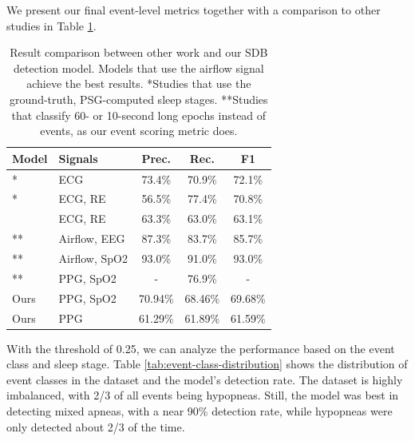 We present our final event-level metrics together with a comparison to other studies in Table \ref{tab:final-metrics}.

\renewcommand{\arraystretch}{1.5}
\begin{table}
    \centering
    \begin{tabular}{ l l c c c }
        Model & Signals & Prec. & Rec. & F1\\
        \hline
        \cite{olsen2020robust}* & ECG & 73.4\% & 70.9\% & 72.1\% \\
        \cite{xie2023use}* & ECG, RE & 56.5\% & 77.4\% & 70.8\% \\
        \cite{xie2024multi} & ECG, RE & 63.3\% & 63.0\% & 63.1\% \\
        \cite{li2023deep}** & Airflow, EEG & 87.3\% & 83.7\% & 85.7\% \\
        \cite{yook2024deep}** & Airflow, SpO2 & 93.0\% & 91.0\% & 93.0\% \\
        \cite{lazazzera2020detection}** & PPG, SpO2 & - & 76.9\% & - \\
        Ours & PPG, SpO2 & 70.94\% & 68.46\% & 69.68\% \\
        Ours & PPG & 61.29\% & 61.89\% & 61.59\% \\
    \end{tabular}
    \caption{Result comparison between other work and our SDB detection model. Models that use the airflow signal achieve the best results. *Studies that use the ground-truth, PSG-computed sleep stages. **Studies that classify 60- or 10-second long epochs instead of events, as our event scoring metric does. \label{tab:final-metrics}}
\end{table}

With the threshold of 0.25, we can analyze the performance based on the event class and sleep stage. Table \ref{tab:event-class-distribution} shows the distribution of event classes in the dataset and the model's detection rate. The dataset is highly imbalanced, with 2/3 of all events being hypopneas. Still, the model was best in detecting mixed apneas, with a near 90\% detection rate, while hypopneas were only detected about 2/3 of the time.


